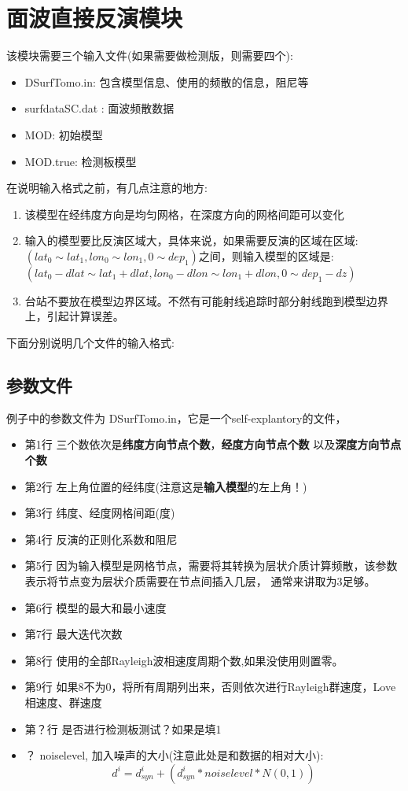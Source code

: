 \documentclass[10p,UTF8]{ctexart}
\begin{document}
   \section{面波直接反演模块}
   该模块需要三个输入文件(如果需要做检测版，则需要四个):
   \begin{itemize}
       \item DSurfTomo.in: 包含模型信息、使用的频散的信息，阻尼等
       \item surfdataSC.dat : 面波频散数据
       \item MOD: 初始模型
       \item MOD.true: 检测板模型
   \end{itemize}
   在说明输入格式之前，有几点注意的地方:
   \begin{enumerate}[(1)]
        \item 该模型在经纬度方向是均匀网格，在深度方向的网格间距可以变化
       \item 输入的模型要比反演区域大，具体来说，如果需要反演的区域在区域:
              $(lat_0 \sim lat_1,lon_0\sim lon_1,0\sim dep_1)$之间，则输入模型的区域是:
              $(lat_0-dlat \sim lat_1+dlat, lon_0-dlon \sim lon_1+dlon,0 \sim dep_1-dz)$
        \item 台站不要放在模型边界区域。不然有可能射线追踪时部分射线跑到模型边界上，引起计算误差。
   \end{enumerate}
   下面分别说明几个文件的输入格式:
   \subsection{参数文件}
   例子中的参数文件为 DSurfTomo.in，它是一个self-explantory的文件，
   \begin{itemize}
       \item 第1行 三个数依次是\textbf{纬度方向节点个数}，\textbf{经度方向节点个数}
                   以及\textbf{深度方向节点个数}
       \item 第2行 左上角位置的经纬度(注意这是\textbf{输入模型}的左上角！)
       \item 第3行 纬度、经度网格间距(度)
       \item 第4行 反演的正则化系数和阻尼
       \item 第5行 因为输入模型是网格节点，需要将其转换为层状介质计算频散，该参数表示将节点变为层状介质需要在节点间插入几层，
                    通常来讲取为3足够。
       \item 第6行 模型的最大和最小速度
       \item 第7行 最大迭代次数
       \item 第8行 使用的全部Rayleigh波相速度周期个数,如果没使用则置零。
       \item 第9行 如果8不为0，将所有周期列出来，否则依次进行Rayleigh群速度，Love相速度、群速度
       \item 第？行 是否进行检测板测试？如果是填1
       \item ？  noiselevel, 加入噪声的大小(注意此处是和数据的相对大小):
       \[   
           d^i = d_{syn}^i + (d_{syn}^i * noiselevel * N(0,1))
        \]
   \end{itemize}
\end{document}
